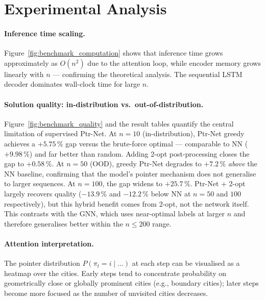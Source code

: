 \documentclass[12pt,a4paper]{article}
\begin{document}
\section{Experimental Analysis}

\paragraph{Inference time scaling.}
Figure~\ref{fig:benchmark_computation} shows that inference time grows
approximately as $O(n^2)$ due to the attention loop, while encoder memory
grows linearly with $n$ --- confirming the theoretical analysis.
The sequential LSTM decoder dominates wall-clock time for large $n$.

\paragraph{Solution quality: in-distribution vs.\ out-of-distribution.}
Figure~\ref{fig:benchmark_quality} and the result tables quantify the
central limitation of supervised Ptr-Net.
At $n = 10$ (in-distribution), Ptr-Net greedy achieves a $+5.75\,\%$ gap
versus the brute-force optimal --- comparable to NN ($+9.98\,\%$) and far
better than random.
Adding 2-opt post-processing closes the gap to $+0.58\,\%$.
At $n = 50$ (OOD), greedy Ptr-Net degrades to $+7.2\,\%$ \emph{above}
the NN baseline, confirming that the model's pointer mechanism does not
generalise to larger sequences.
At $n = 100$, the gap widens to $+25.7\,\%$.
Ptr-Net + 2-opt largely recovers quality ($-13.9\,\%$ and $-12.2\,\%$
below NN at $n = 50$ and $100$ respectively), but this hybrid benefit
comes from 2-opt, not the network itself.
This contrasts with the GNN, which uses near-optimal labels at larger $n$
and therefore generalises better within the $n \leq 200$ range.

\paragraph{Attention interpretation.}
The pointer distribution $P(\pi_t = i \mid \ldots)$ at each step can be
visualised as a heatmap over the cities.
Early steps tend to concentrate probability on geometrically close or
globally prominent cities (e.g., boundary cities); later steps become more
focused as the number of unvisited cities decreases.
\end{document}
